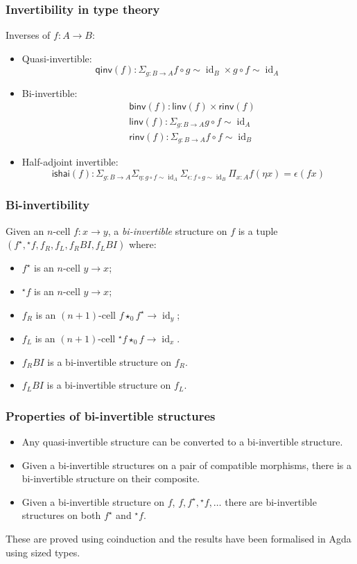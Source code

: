 \documentclass[presentation]{beamer}
\DeclareMathOperator{\id}{id}
\newcommand{\linv}[1]{{}^\star\!#1}
\newcommand{\rinv}[1]{#1^\star}
\newcommand{\comp}{\star}
\begin{document}
\begin{frame}
  \frametitle{Invertibility in type theory}
  Inverses of \(f : A \to B\):
  \begin{itemize}
  \item Quasi-invertible:
    \[ \mathsf{qinv}(f) : \Sigma_{g : B \to A} f \circ g \sim \id_B \times g \circ f \sim \id_A\]
  \item Bi-invertible:
    \begin{align*}
      &\mathsf{binv}(f) : \mathsf{linv}(f) \times \mathsf{rinv}(f) \\
      &\mathsf{linv}(f) : \Sigma_{g : B \to A} g \circ f \sim \id_A \\
      &\mathsf{rinv}(f) : \Sigma_{g : B \to A} f \circ f \sim \id_B
    \end{align*}
  \item Half-adjoint invertible:
    \[ \mathsf{ishai}(f) : \Sigma_{g : B \to A} \Sigma_{\eta : g \circ f \sim \id_A} \Sigma_{\epsilon : f \circ g \sim \id_B} \Pi_{x : A} f(\eta x) = \epsilon(f x) \]
  \end{itemize}
\end{frame}

\begin{frame}
  \frametitle{Bi-invertibility}
    Given an \(n\)-cell \(f : x \to y\), a \emph{bi-invertible} structure on \(f\) is a tuple \((\rinv f, \linv f, f_R, f_L, f_R{}BI, f_L{}BI)\) where:
  \begin{itemize}
  \item \(\rinv f\) is an \(n\)-cell \(y \to x\);
  \item \(\linv f\) is an \(n\)-cell \(y \to x\);
  \item \(f_R\) is an \((n+1)\)-cell \(f \comp_0 \rinv f \to \id_y\);
  \item \(f_L\) is an \((n+1)\)-cell \(\linv f \comp_0 f \to \id_x\).
  \item \(f_R{}BI\) is a bi-invertible structure on \(f_R\).
  \item \(f_L{}BI\) is a bi-invertible structure on \(f_L\).
  \end{itemize}
\end{frame}

\begin{frame}
  \frametitle{Properties of bi-invertible structures}
  \begin{itemize}
  \item Any quasi-invertible structure can be converted to a bi-invertible structure.
  \item Given a bi-invertible structures on a pair of compatible morphisms, there is a bi-invertible structure on their composite.
  \item Given a bi-invertible structure on \(f\), \(f, \rinv f, \linv f, \dots\) there are bi-invertible structures on both \(\rinv f\) and \(\linv f\).
  \end{itemize}
  \pause{}
  These are proved using coinduction and the results have been formalised in Agda using sized types.
\end{frame}
\end{document}
